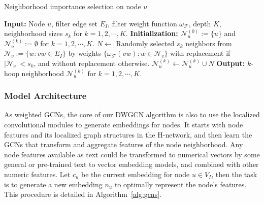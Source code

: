 \documentclass[manuscript,screen,review]{acmart}
\newcommand\Fcal{\mathcal{F}}
\newcommand{\Ncal}{\mathcal{N}}
\begin{document}
\begin{algorithm}[h]
\caption{Neighborhood importance selection on node $u$}
\label{alg:nodes}
\begin{algorithmic}[1]
\STATE \textbf{Input:} Node $u$, filter edge set $E_I$, filter weight function $\omega_{\Fcal}$, depth $K$, neighborhood sizes $s_k$ for $k=1,2,\cdots,K$.
\STATE \textbf{Initialization:} $\Ncal_u^{(0)}:=\{u\}$ and $\Ncal_u^{(k)}:=\emptyset$ for $k=1,2,\cdots,K$.
\FOR{$v\in \Ncal_u^{(k-1)}$}
\STATE $N\leftarrow$ Randomly selected $s_k$ neighbors from $\Ncal_v:=\{w: vw\in E_I\}$ by weights $\{\omega_{\Fcal}(vw): w\in\Ncal_v\}$ with replacement if $|\Ncal_v|<s_k$, and without replacement otherwise.
\STATE $\Ncal_u^{(k)}\leftarrow \Ncal_u^{(k)}\cup N$
\ENDFOR
\ENDFOR
\STATE 
\textbf{Output:} $k$-hoop neighborhood $\Ncal_u^{(k)}$ for $k=1,2,\cdots,K$.
\end{algorithmic}
\end{algorithm}

\subsubsection{Model Architecture}
As weighted GCNs, the core of our DWGCN algorithm is also to use the localized convolutional modules to generate embeddings for nodes. It starts with node features and its localized graph structures in the H-network, and then learn the GCNs that transform and aggregate features of the node neighborhood. 
Any node features available as text could be transformed to numerical vectors by some general or pre-trained text to vector embedding models, and combined with other numeric features. 
Let $c_u$ be the current embedding for node $u\in V_I$, then the task is to generate a new embedding $n_u$ to optimally represent the node's features. This procedure is detailed in Algorithm~\ref{alg:gcns}.
\end{document}
